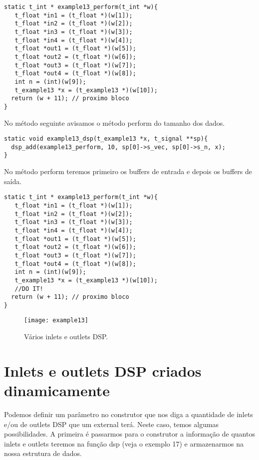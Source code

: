 \begin{lstlisting}
static t_int * example13_perform(t_int *w){
   t_float *in1 = (t_float *)(w[1]);
   t_float *in2 = (t_float *)(w[2]);
   t_float *in3 = (t_float *)(w[3]);
   t_float *in4 = (t_float *)(w[4]);
   t_float *out1 = (t_float *)(w[5]);
   t_float *out2 = (t_float *)(w[6]);
   t_float *out3 = (t_float *)(w[7]);
   t_float *out4 = (t_float *)(w[8]);
   int n = (int)(w[9]);
   t_example13 *x = (t_example13 *)(w[10]);
  return (w + 11); // proximo bloco
}
\end{lstlisting}

No método seguinte avisamos o método perform do tamanho dos dados.
\begin{lstlisting}
static void example13_dsp(t_example13 *x, t_signal **sp){
  dsp_add(example13_perform, 10, sp[0]->s_vec, sp[0]->s_n, x);
}
\end{lstlisting}

No método perform teremos primeiro os buffers de entrada e depois os buffers de
saída.

\begin{lstlisting}
static t_int * example13_perform(t_int *w){
   t_float *in1 = (t_float *)(w[1]);
   t_float *in2 = (t_float *)(w[2]);
   t_float *in3 = (t_float *)(w[3]);
   t_float *in4 = (t_float *)(w[4]);
   t_float *out1 = (t_float *)(w[5]);
   t_float *out2 = (t_float *)(w[6]);
   t_float *out3 = (t_float *)(w[7]);
   t_float *out4 = (t_float *)(w[8]);
   int n = (int)(w[9]);
   t_example13 *x = (t_example13 *)(w[10]);
   //DO IT!
  return (w + 11); // proximo bloco
}
\end{lstlisting}

\begin{figure}[h!]
	\centering
	\texttt{[image: example13]}
	\caption{Vários inlets e outlets DSP.}
\end{figure}

\section{Inlets e outlets DSP criados dinamicamente}

Podemos definir um parâmetro no construtor que nos diga a quantidade de inlets
e/ou de outlets DSP que um external terá. Neste caso, temos algumas
possibilidades. A primeira é passarmos para o construtor a informação de quantos inlets e
outlets teremos na função dsp (veja o exemplo 17) e armazenarmos na nossa estrutura de dados.

